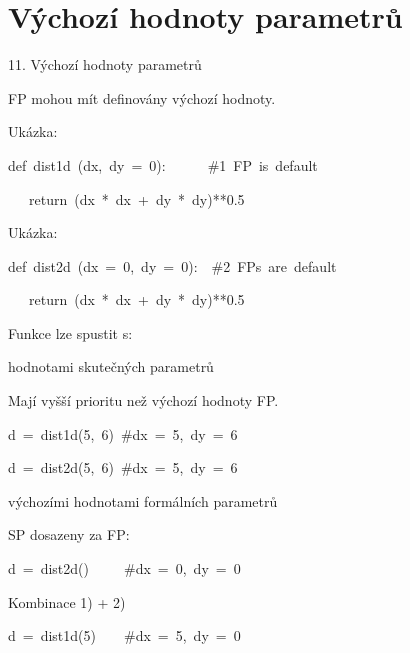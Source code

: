\documentclass[czech]{beamer}
\newenvironment{lyxcode}
  {\par\begin{list}{}{
    \setlength{\rightmargin}{\leftmargin}
    \setlength{\listparindent}{0pt}%
    \raggedright
    \setlength{\itemsep}{0pt}
    \setlength{\parsep}{0pt}
    \normalfont\ttfamily}%
   \def\{{\char`\{}
   \def\}{\char`\}}
   \def\textasciitilde{\char`\~}
   \item[]}
  {\end{list}}
\begin{document}
\section{Výchozí hodnoty parametrů}
\begin{frame}{11. Výchozí hodnoty parametrů}

{\scriptsize FP mohou mít definovány výchozí hodnoty.}{\scriptsize\par}

{\scriptsize Ukázka:}{\scriptsize\par}
\begin{lyxcode}
{\scriptsize def~dist1d~(dx,~dy~=~0):~~~~~~\#1~FP~is~default}{\scriptsize\par}

{\scriptsize ~~~return~(dx~{*}~dx~+~dy~{*}~dy){*}{*}0.5}{\scriptsize\par}
\end{lyxcode}
{\scriptsize Ukázka:}{\scriptsize\par}
\begin{lyxcode}
{\scriptsize def~dist2d~(dx~=~0,~dy~=~0):~~\#2~FPs~are~default}{\scriptsize\par}

{\scriptsize ~~~return~(dx~{*}~dx~+~dy~{*}~dy){*}{*}0.5}{\scriptsize\par}

\end{lyxcode}
{\scriptsize Funkce lze spustit s:}{\scriptsize\par}
\begin{enumerate}
\item {\scriptsize hodnotami skutečných parametrů}{\scriptsize\par}

{\scriptsize Mají vyšší prioritu než výchozí hodnoty FP.}{\scriptsize\par}
\begin{lyxcode}
{\scriptsize d~=~dist1d(5,~6)~\#dx~=~5,~dy~=~6}{\scriptsize\par}

{\scriptsize d~=~dist2d(5,~6)~\#dx~=~5,~dy~=~6}{\scriptsize\par}
\end{lyxcode}
\item {\scriptsize výchozími hodnotami formálních parametrů}{\scriptsize\par}

{\scriptsize SP dosazeny za FP:}{\scriptsize\par}
\begin{lyxcode}
{\scriptsize d~=~dist2d()~~~~~\#dx~=~0,~dy~=~0}{\scriptsize\par}
\end{lyxcode}
\item {\scriptsize Kombinace 1) + 2)}{\scriptsize\par}
\begin{lyxcode}
{\scriptsize d~=~dist1d(5)~~~~\#dx~=~5,~dy~=~0}{\scriptsize\par}


\end{lyxcode}
\end{enumerate}
\end{frame}
\end{document}

